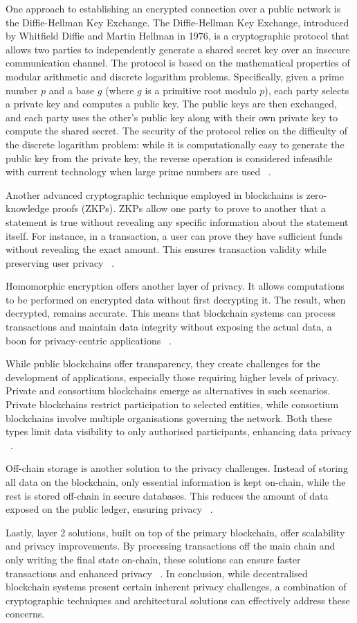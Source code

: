 One approach to establishing  an encrypted connection over a public network is the Diffie-Hellman Key Exchange. The Diffie-Hellman Key Exchange, introduced by Whitfield Diffie and Martin Hellman in 1976, is a cryptographic protocol that allows two parties to independently generate a shared secret key over an insecure communication channel. The protocol is based on the mathematical properties of modular arithmetic and discrete logarithm problems. Specifically, given a prime number \( p \) and a base \( g \) (where \( g \) is a primitive root modulo \( p \)), each party selects a private key and computes a public key. The public keys are then exchanged, and each party uses the other's public key along with their own private key to compute the shared secret. The security of the protocol relies on the difficulty of the discrete logarithm problem: while it is computationally easy to generate the public key from the private key, the reverse operation is considered infeasible with current technology when large prime numbers are used ~\cite{1055638}.

Another advanced cryptographic technique employed in blockchains is zero-knowledge proofs (ZKPs). ZKPs allow one party to prove to another that a statement is true without revealing any specific information about the statement itself. For instance, in a transaction, a user can prove they have sufficient funds without revealing the exact amount. This ensures transaction validity while preserving user privacy ~\cite{Tran.2022b}.

Homomorphic encryption offers another layer of privacy. It allows computations to be performed on encrypted data without first decrypting it. The result, when decrypted, remains accurate. This means that blockchain systems can process transactions and maintain data integrity without exposing the actual data, a boon for privacy-centric applications ~\cite{Putra.}.

While public blockchains offer transparency, they create challenges for the development of applications, especially those requiring higher levels of privacy. Private and consortium blockchains emerge as alternatives in such scenarios. Private blockchains restrict participation to selected entities, while consortium blockchains involve multiple organisations governing the network. Both these types limit data visibility to only authorised participants, enhancing data privacy ~\cite{9334132}.

Off-chain storage is another solution to the privacy challenges. Instead of storing all data on the blockchain, only essential information is kept on-chain, while the rest is stored off-chain in secure databases. This reduces the amount of data exposed on the public ledger, ensuring privacy ~\cite{9838289}.

Lastly, layer 2 solutions, built on top of the primary blockchain, offer scalability and privacy improvements. By processing transactions off the main chain and only writing the final state on-chain, these solutions can ensure faster transactions and enhanced privacy ~\cite{10039486}. In conclusion, while decentralised blockchain systems present certain inherent privacy challenges, a combination of cryptographic techniques and architectural solutions can effectively address these concerns.
